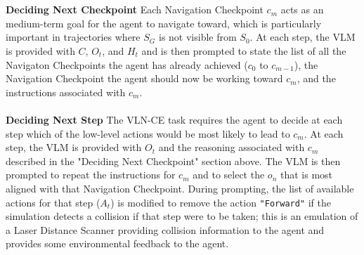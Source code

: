 \documentclass{svproc}
\begin{document}
    \\ \\
    \textbf{Deciding Next Checkpoint}  Each Navigation Checkpoint $c_m$ acts as an medium-term goal for the agent to navigate toward, which is particularly important in trajectories where $S_G$ is not visible from $S_0$. At each step, the VLM is provided with $C$, $O_t$, and $H_t$ and is then prompted to state the list of all the Navigaton Checkpoints the agent has already achieved ($c_0$ to $c_{m-1}$), the Navigation Checkpoint the agent should now be working toward $c_m$, and the instructions associated with $c_m$.
    \\ \\
    \textbf{Deciding Next Step}  The VLN-CE task requires the agent to decide at each step which of the low-level actions would be most likely to lead to $c_m$. At each step, the VLM is provided with $O_t$ and the reasoning associated with $c_m$ described in the "Deciding Next Checkpoint" section above. The VLM is then prompted to repeat the instructions for $c_m$ and to select the $o_n$ that is most aligned with that Navigation Checkpoint. During prompting, the list of available actions for that step ($A_t$) is modified to remove the action \texttt{"Forward"} if the simulation detects a collision if that step were to be taken; this is an emulation of a Laser Distance Scanner providing collision information to the agent and provides some environmental feedback to the agent.
\end{document}
